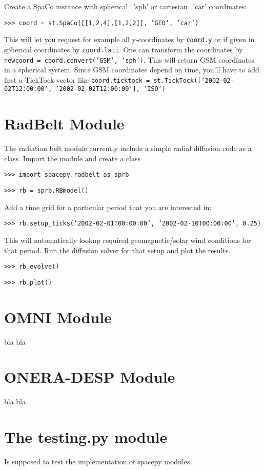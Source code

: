 \documentclass[11pt]{amsart}
\begin{document}
 Create a SpaCo instance with spherical='sph' or cartesian='car' coordinates:
 
 \texttt{>>> coord = st.SpaCo([[1,2,4],[1,2,2]], 'GEO', 'car')}
 
 This will let you request for example all y-coordinates by \texttt{coord.y} or if given in spherical coordinates by \texttt{coord.lati}. One can transform the coordinates by \texttt{newcoord = coord.convert('GSM', 'sph')}. This will return GSM coordinates in a spherical system. Since GSM coordinates depend on time, you'll have to add first a TickTock vector like \texttt{coord.ticktock = st.TickTock(['2002-02-02T12:00:00', '2002-02-02T12:00:00'], 'ISO')}
 
\section{RadBelt Module}

The radiation belt module currently include a simple radial diffusion code as a class. Import the module and create a class

\texttt{>>> import spacepy.radbelt as sprb}

\texttt{>>> rb = sprb.RBmodel()}

Add a time grid for a particular period that you are interested in:

\texttt{>>> rb.setup\_ticks('2002-02-01T00:00:00', '2002-02-10T00:00:00', 0.25)}

This will automatically lookup required geomagnetic/solar wind conditions for that period. Run the diffusion solver for that setup and plot the results.

\texttt{>>> rb.evolve()}

\texttt{>>> rb.plot()}



\section{OMNI Module}

bla bla

\section{ONERA-DESP Module}

bla bla


\section{The testing.py module}

Is supposed to test the implementation of spacepy modules.
\end{document}

